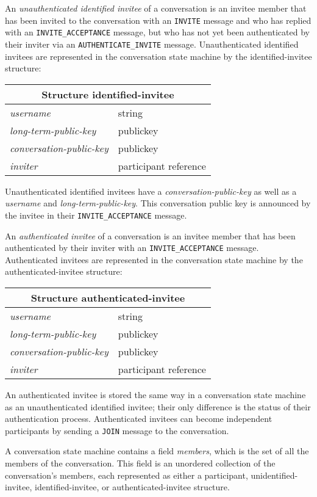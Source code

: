 \documentclass{article}
\def\message#1{\texttt{#1}}
\def\smfield#1{\textsl{#1}}
\def\type#1{\textsf{#1}}
\newenvironment{struct}[1]{
\newcommand{\structfield}[2]{
\smfield{##1} & \type{##2} \\
\hline
}
\par
\vspace{-\medskipamount}
\hspace{2em minus 2em}\begin{tabular}{|l|l|}
\hline
\multicolumn{2}{|c|}{Structure \type{#1}} \\
\hline
\hline
}{
\end{tabular}
\vspace{-\medskipamount}
\par
}
\begin{document}
An \emph{unauthenticated identified invitee} of a conversation is an invitee member that has been invited to the conversation with an \message{INVITE} message and who has replied with an \message{INVITE\_ACCEPTANCE} message, but who has not yet been authenticated by their inviter via an \message{AUTHENTICATE\_INVITE} message.
Unauthenticated identified invitees are represented in the conversation state machine by the \type{identified-invitee} structure:
\begin{struct}{identified-invitee}
\structfield{username}{string}
\structfield{long-term-public-key}{publickey}
\structfield{conversation-public-key}{publickey}
\structfield{inviter}{participant reference}
\end{struct}
Unauthenticated identified invitees have a \smfield{conversation-public-key} as well as a \smfield{username} and \smfield{long-term-public-key}.
This conversation public key is announced by the invitee in their \message{INVITE\_ACCEPTANCE} message.

An \emph{authenticated invitee} of a conversation is an invitee member that has been authenticated by their inviter with an \message{INVITE\_ACCEPTANCE} message.
Authenticated invitees are represented in the conversation state machine by the \type{authenticated-invitee} structure:
\begin{struct}{authenticated-invitee}
\structfield{username}{string}
\structfield{long-term-public-key}{publickey}
\structfield{conversation-public-key}{publickey}
\structfield{inviter}{participant reference}
\end{struct}
An authenticated invitee is stored the same way in a conversation state machine as an unauthenticated identified invitee; their only difference is the status of their authentication process.
Authenticated invitees can become independent participants by sending a \message{JOIN} message to the conversation.


A conversation state machine contains a field \smfield{members}, which is the set of all the members of the conversation.
This field is an unordered collection of the conversation's members, each represented as either a \type{participant}, \type{unidentified-invitee}, \type{identified-invitee}, or \type{authenticated-invitee} structure.
\end{document}
